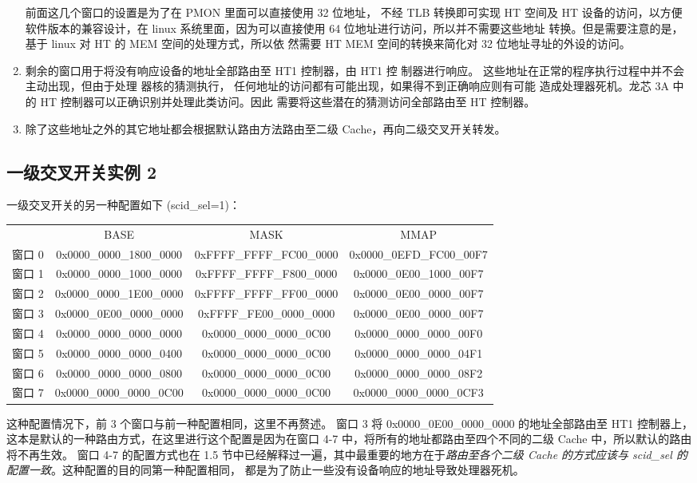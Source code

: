 \begin{enumerate}
    前面这几个窗口的设置是为了在 PMON 里面可以直接使用 32 位地址， 不经 TLB
    转换即可实现 HT 空间及 HT 设备的访问，以方便软件版本的兼容设计，在 linux
    系统里面，因为可以直接使用 64 位地址进行访问，所以并不需要这些地址
    转换。但是需要注意的是，基于 linux 对 HT 的 MEM 空间的处理方式，所以依
    然需要 HT MEM 空间的转换来简化对 32 位地址寻址的外设的访问。

  \item 剩余的窗口用于将没有响应设备的地址全部路由至 HT1 控制器，由 HT1 控
    制器进行响应。 这些地址在正常的程序执行过程中并不会主动出现，但由于处理
    器核的猜测执行， 任何地址的访问都有可能出现，如果得不到正确响应则有可能
    造成处理器死机。龙芯 3A 中的 HT 控制器可以正确识别并处理此类访问。因此
    需要将这些潜在的猜测访问全部路由至 HT 控制器。

  \item 除了这些地址之外的其它地址都会根据默认路由方法路由至二级
    Cache，再向二级交叉开关转发。
\end{enumerate}

\subsection{一级交叉开关实例 2}

\noindent 一级交叉开关的另一种配置如下 (scid\_sel=1)：
\begin{center}
  \begin{tabular}[h]{|c|c|c|c|} \hline
    & BASE                     & MASK                     & MMAP \\ \hhline
    窗口 0 & 0x0000\_0000\_1800\_0000 & 0xFFFF\_FFFF\_FC00\_0000 & 0x0000\_0EFD\_FC00\_00F7 \\ \hline
    窗口 1 & 0x0000\_0000\_1000\_0000 & 0xFFFF\_FFFF\_F800\_0000 & 0x0000\_0E00\_1000\_00F7 \\ \hline
    窗口 2 & 0x0000\_0000\_1E00\_0000 & 0xFFFF\_FFFF\_FF00\_0000 & 0x0000\_0E00\_0000\_00F7 \\ \hline
    窗口 3 & 0x0000\_0E00\_0000\_0000 & 0xFFFF\_FE00\_0000\_0000 & 0x0000\_0E00\_0000\_00F7 \\ \hline
    窗口 4 & 0x0000\_0000\_0000\_0000 & 0x0000\_0000\_0000\_0C00 & 0x0000\_0000\_0000\_00F0 \\ \hline
    窗口 5 & 0x0000\_0000\_0000\_0400 & 0x0000\_0000\_0000\_0C00 & 0x0000\_0000\_0000\_04F1 \\ \hline
    窗口 6 & 0x0000\_0000\_0000\_0800 & 0x0000\_0000\_0000\_0C00 & 0x0000\_0000\_0000\_08F2 \\ \hline
    窗口 7 & 0x0000\_0000\_0000\_0C00 & 0x0000\_0000\_0000\_0C00 & 0x0000\_0000\_0000\_0CF3 \\ \hline
  \end{tabular}
\end{center}
这种配置情况下，前 3 个窗口与前一种配置相同，这里不再赘述。 窗口 3 将
0x0000\_0E00\_0000\_0000 的地址全部路由至 HT1
控制器上，这本是默认的一种路由方式，在这里进行这个配置是因为在窗口 4-7
中，将所有的地址都路由至四个不同的二级 Cache 中，所以默认的路由将不再生效。
窗口 4-7 的配置方式也在 1.5
节中已经解释过一遍，其中最重要的地方在于\emph{路由至各个二级 Cache 的方式应该与
scid\_sel 的配置一致}。这种配置的目的同第一种配置相同，
都是为了防止一些没有设备响应的地址导致处理器死机。


